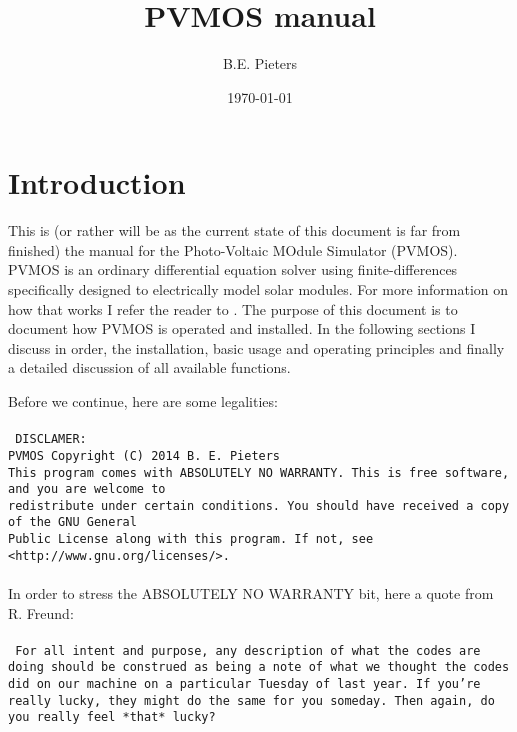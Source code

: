 \documentclass[noshowpacs,preprintnumbers,amsmath,amssymb, letter]{revtex4}
\begin{document}
\title{PVMOS manual}

\author{B.E. Pieters}%
\date{\today}
\maketitle

\section{Introduction}
This is (or rather will be as the current state of this document is far from finished) the manual for the Photo-Voltaic MOdule Simulator (PVMOS). PVMOS is an ordinary differential equation solver using finite-differences specifically designed to electrically model solar modules. For more information on how that works I refer the reader to \cite{pvmos:2014}. The purpose of this document is to document how PVMOS is operated and installed. In the following sections I discuss in order, the installation, basic usage and operating principles and finally a detailed discussion of all available functions.

Before we continue, here are some legalities:\\\\
\texttt{
DISCLAMER:\\
PVMOS  Copyright (C) 2014  B. E. Pieters\\
This program comes with ABSOLUTELY NO WARRANTY. This is free software, and you are welcome to\\
redistribute under certain conditions. You should have received a copy of the GNU General \\
Public License along with this program. If not, see <http://www.gnu.org/licenses/>.\\
}\\
In order to stress the ABSOLUTELY NO WARRANTY bit, here a quote from R. Freund:\\\\
\texttt{
For all intent and purpose, any description of what the codes are doing should be construed as being a note of what we thought the codes did on our machine on a particular Tuesday of last year. If you're really lucky, they might do the same for you someday. Then again, do you really feel *that* lucky?\\
}
\end{document}
